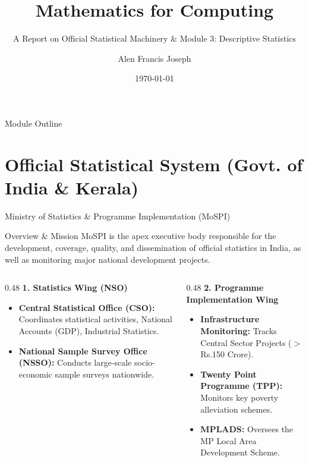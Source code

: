 \documentclass[10pt, aspectratio=169]{beamer}
\title[Module 3: Descriptive Statistics]{Mathematics for Computing}
\subtitle{A Report on Official Statistical Machinery \& Module 3: Descriptive Statistics}
\author{Alen Francis Joseph}
\institute{M.Tech CSE (DS and AI), DCS, CUSAT}
\date{\today}
\begin{document}
\begin{frame}
    \titlepage
\end{frame}

\begin{frame}{Module Outline}
    \tableofcontents
\end{frame}

\section{Official Statistical System (Govt. of India \& Kerala)}

\begin{frame}{Ministry of Statistics \& Programme Implementation (MoSPI)}
    \begin{block}{Overview \& Mission}
        MoSPI is the apex executive body responsible for the development, coverage, quality, and dissemination of official statistics in India, as well as monitoring major national development projects.
    \end{block}

    \begin{columns}[T]
        \begin{column}{0.48\textwidth}
            \textbf{1. Statistics Wing (NSO)}
            \begin{itemize}
                \item \textbf{Central Statistical Office (CSO):} Coordinates statistical activities, National Accounts (GDP), Industrial Statistics.
                \item \textbf{National Sample Survey Office (NSSO):} Conducts large-scale socio-economic sample surveys nationwide.
            \end{itemize}
        \end{column}
        
        \begin{column}{0.48\textwidth}
            \textbf{2. Programme Implementation Wing}
            \begin{itemize}
                \item \textbf{Infrastructure Monitoring:} Tracks Central Sector Projects ($>$ Rs.150 Crore).
                \item \textbf{Twenty Point Programme (TPP):} Monitors key poverty alleviation schemes.
                \item \textbf{MPLADS:} Oversees the MP Local Area Development Scheme.
            \end{itemize}
        \end{column}
    \end{columns}
\end{frame}
\end{document}
